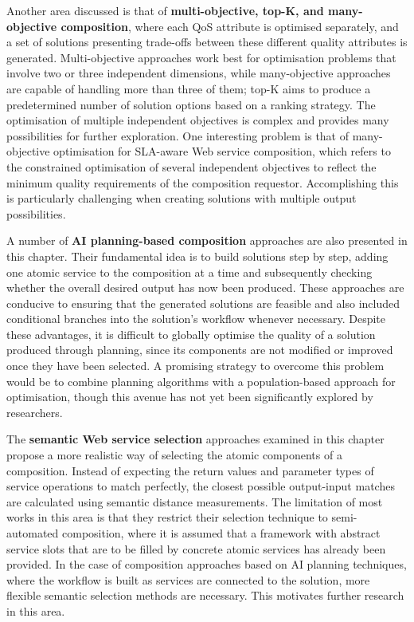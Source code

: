 Another area discussed is that of \textbf{multi-objective, top-K, and many-objective composition}, where each QoS attribute is optimised separately, and a set of solutions presenting trade-offs between these different quality attributes is generated. Multi-objective approaches work best for optimisation problems that involve two or three independent dimensions, while many-objective approaches are capable of handling more than three of them; top-K aims to produce a predetermined number of solution options based on a ranking strategy. The optimisation of multiple independent objectives is complex and provides many possibilities for further exploration. One interesting problem is that of many-objective optimisation for SLA-aware Web service composition, which refers to the constrained optimisation of several independent objectives to reflect the minimum quality requirements of the composition requestor. Accomplishing this is particularly challenging when creating solutions with multiple output possibilities.

A number of \textbf{AI planning-based composition} approaches are also presented in this chapter. Their fundamental idea is to build solutions step by step, adding one atomic service to the composition at a time and subsequently checking whether the overall desired output has now been produced. These approaches are conducive to ensuring that the generated solutions are feasible and also included conditional branches into the solution's workflow whenever necessary. Despite these advantages, it is difficult to globally optimise the quality of a solution produced through planning, since its components are not modified or improved once they have been selected. A promising strategy to overcome this problem would be to combine planning algorithms with a population-based approach for optimisation, though this avenue has not yet been significantly explored by researchers.

The \textbf{semantic Web service selection} approaches examined in this chapter propose a more realistic way of selecting the atomic components of a composition. Instead of expecting the return values and parameter types of service operations to match perfectly, the closest possible output-input matches are calculated using semantic distance measurements. The limitation of most works in this area is that they restrict their selection technique to semi-automated composition, where it is assumed that a framework with abstract service slots that are to be filled by concrete atomic services has already been provided. In the case of composition approaches based on AI planning techniques, where the workflow is built as services are connected to the solution, more flexible semantic selection methods are necessary. This motivates further research in this area.

